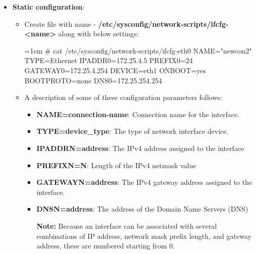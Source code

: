\begin{flushleft}
\begin{itemize}
	
	
	\newpage
	
	\item \textbf{Static configuration}:
	\begin{itemize}
		\item Create file with name -  \textbf{/etc/sysconfig/network-scripts/ifcfg-<name>} along with below settings:
		\begin{tcolorbox}[breakable,notitle,boxrule=-0pt,colback=black,colframe=black]
			\color{green}
			\font=1em
			\# cat /etc/sysconfig/network-scripts/ifcfg-eth0
			\color{white}
			\newline
			NAME="newcon2"
			\newline
			TYPE=Ethernet
			\newline
			IPADDR0=172.25.4.5
			\newline
			PREFIX0=24
			\newline
			GATEWAY0=172.25.4.254
			\newline
			DEVICE=eth1
			\newline
			ONBOOT=yes
			\newline
			BOOTPROTO=none
			\newline
			DNS0=172.25.254.254
			\font=4pt
		\end{tcolorbox}
		\bigskip
		\bigskip
		\item A description of some of these configuration parameters follows:
		\begin{itemize}
			\item \textbf{NAME=connection-name}: Connection name for the interface.
			\item \textbf{TYPE=device\_type}: The type of network interface device.
			\item \textbf{IPADDRN=address}: The IPv4 address assigned to the interface
			\item \textbf{PREFIXN=N}: Length of the IPv4 netmask value
			\item \textbf{GATEWAYN=address}: The IPv4 gateway address assigned to the interface. 
			\item \textbf{DNSN=address}: The address of the Domain Name Servers (DNS)

		
			\begin{tcolorbox}[breakable,notitle,boxrule=-0pt,colback=yellow,colframe=yellow]
				\color{black}
				\textbf{Note:} Because an interface can be associated with several combinations of IP address, network mask prefix length, and gateway address, these are numbered starting from 0.
			\end{tcolorbox}


\end{itemize}
\end{itemize}
\end{itemize}
\end{flushleft}
